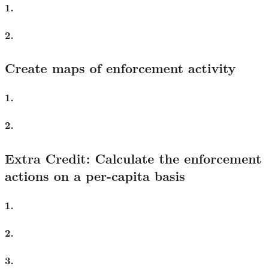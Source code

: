\documentclass[
  letterpaper,
  DIV=11,
  numbers=noendperiod]{scrartcl}
\begin{document}
\subsubsection{1.}\label{section-3}

\subsubsection{2.}\label{section-4}

\subsection{Create maps of enforcement
activity}\label{create-maps-of-enforcement-activity}

\subsubsection{1.}\label{section-5}

\subsubsection{2.}\label{section-6}

\subsection{Extra Credit: Calculate the enforcement actions on a
per-capita
basis}\label{extra-credit-calculate-the-enforcement-actions-on-a-per-capita-basis}

\subsubsection{1.}\label{section-7}

\subsubsection{2.}\label{section-8}

\subsubsection{3.}\label{section-9}
\end{document}
